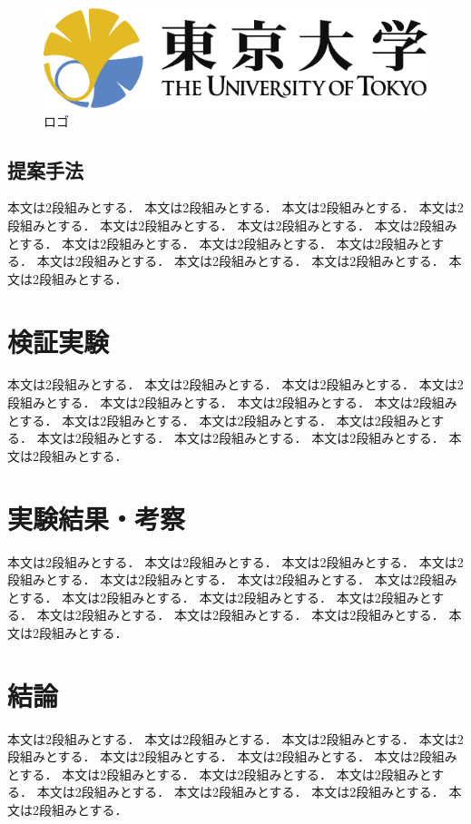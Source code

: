 \documentclass{/workdir/classes/summary}
\begin{document}
\begin{figure}[tb]
  \centering
  \includegraphics[keepaspectratio, width=\linewidth]{utlogo.pdf}
  \caption{ロゴ}
  \label{fig:logo}
\end{figure}

\subsection{提案手法}
本文は2段組みとする．
本文は2段組みとする．
本文は2段組みとする．
本文は2段組みとする．
本文は2段組みとする．
本文は2段組みとする．
本文は2段組みとする．
本文は2段組みとする．
本文は2段組みとする．
本文は2段組みとする．
本文は2段組みとする．
本文は2段組みとする．
本文は2段組みとする．
本文は2段組みとする．

\section{検証実験}
本文は2段組みとする．
本文は2段組みとする．
本文は2段組みとする．
本文は2段組みとする．
本文は2段組みとする．
本文は2段組みとする．
本文は2段組みとする．
本文は2段組みとする．
本文は2段組みとする．
本文は2段組みとする．
本文は2段組みとする．
本文は2段組みとする．
本文は2段組みとする．
本文は2段組みとする．

\section{実験結果・考察}
本文は2段組みとする．
本文は2段組みとする．
本文は2段組みとする．
本文は2段組みとする．
本文は2段組みとする．
本文は2段組みとする．
本文は2段組みとする．
本文は2段組みとする．
本文は2段組みとする．
本文は2段組みとする．
本文は2段組みとする．
本文は2段組みとする．
本文は2段組みとする．
本文は2段組みとする．

\section{結論}
本文は2段組みとする．
本文は2段組みとする．
本文は2段組みとする．
本文は2段組みとする．
本文は2段組みとする．
本文は2段組みとする．
本文は2段組みとする．
本文は2段組みとする．
本文は2段組みとする．
本文は2段組みとする．
本文は2段組みとする．
本文は2段組みとする．
本文は2段組みとする．
本文は2段組みとする．



\end{document}
